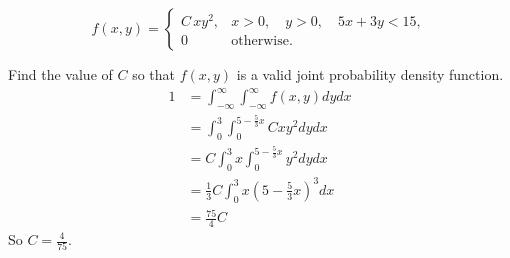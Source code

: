 \documentclass[12pt]{article} %
\newcommand{\Red}{\color{Red}}
\begin{document}
\begin{enumerate}
	\begin{equation*}
			f(x,y)=\begin{cases}
			C\, x y^2 ,&x>0,\quad y>0, \quad  5x+3y<15,\\
			0 & \text{otherwise}.
			\end{cases}
	\end{equation*}


Find the value of $C$ so that $f ( x, y )$ is a valid joint probability density function. \\ {\Red $$\begin{aligned}
        1 &= \int_{-\infty}^{\infty} \int_{-\infty}^{\infty} f(x,y) dydx \\
        &= \int_0^3 \int_0^{5-\frac{5}{3}x} Cxy^2 dydx \\
        &= C \int_0^3 x \int_0^{5-\frac{5}{3}x} y^2 dydx \\
        &= \frac{1}{3}C \int_0^3  x\left( 5-\frac{5}{3}x \right)^3 dx \\
        &= \frac{75}{4} C
    \end{aligned}$$ So $C = \frac{4}{75}$.}
    

\end{enumerate}
\end{document}
